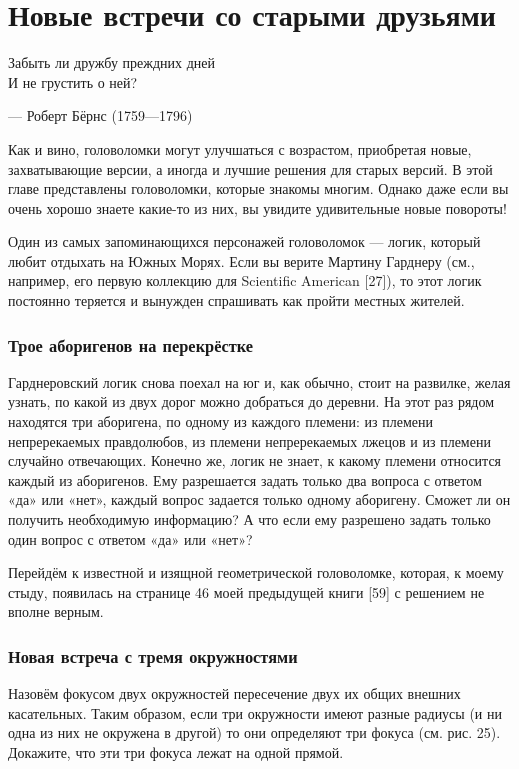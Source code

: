 \chapter{Новые встречи со старыми друзьями}

\setlength{\epigraphwidth}{.53\textwidth}
\epigraph{Забыть ли дружбу преждних дней\\
И не грустить о ней?}{--- Роберт Бёрнс (1759---1796)}

Как и вино, головоломки могут улучшаться с возрастом, приобретая новые, захватывающие версии, а иногда и лучшие решения для старых версий.
В этой главе представлены головоломки, которые знакомы многим.
Однако даже если вы очень хорошо знаете какие-то из них, 
вы увидите удивительные новые повороты!

Один из самых запоминающихся персонажей головоломок --- логик, который любит отдыхать на Южных Морях.
Если вы верите Мартину Гарднеру (см., например, его первую коллекцию для Scientific American [27]), то этот логик постоянно теряется и вынужден спрашивать как пройти местных жителей.

\subsection*{Трое аборигенов на перекрёстке}

Гарднеровский логик снова поехал на юг и, как обычно, стоит на развилке, желая узнать, по какой из двух дорог можно добраться до деревни.
На этот раз рядом находятся три аборигена, по одному из каждого племени:
из племени непререкаемых правдолюбов,
из племени непререкаемых лжецов
и из племени случайно отвечающих.
Конечно же, логик не знает, к какому племени относится каждый из аборигенов.
Ему разрешается задать только два вопроса с ответом «да» или «нет», каждый вопрос задается только одному аборигену.
Сможет ли он получить необходимую информацию?
А что если ему разрешено задать только один вопрос с ответом «да» или «нет»?

\medskip

Перейдём к известной и изящной геометрической головоломке, которая, к моему стыду, появилась на странице 46 моей предыдущей книги [59] с решением не вполне верным.

\subsection*{Новая встреча с тремя окружностями}

Назовём фокусом двух окружностей пересечение двух их общих внешних касательных.
Таким образом, если три окружности имеют разные радиусы (и ни одна из них не окружена в другой) то они определяют три фокуса (см. рис. 25).
Докажите, что эти три фокуса лежат на одной прямой.

